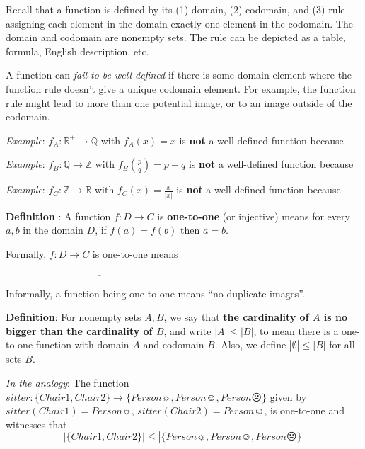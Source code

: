 \documentclass[12pt, oneside]{article}
\begin{document}
\vspace{100pt} \newpage


Recall that a function is defined by its (1) domain, (2) codomain, and (3) rule assigning each 
element in the domain exactly one element in the codomain. 
The domain and codomain are nonempty sets.
The rule can be depicted as a table, formula, English description, etc.

A function can {\it fail to be well-defined} if there is some 
domain element where the function rule doesn't give a
unique codomain element. For example, the function rule might lead to 
more than one potential image, or to an image outside of the codomain.


{\it Example}: $f_A: \mathbb{R}^+ \to \mathbb{Q}$ with $f_A(x) = x$ is {\bf not} a well-defined function because

\vspace{100pt}


{\it Example}: $f_B: \mathbb{Q} \to \mathbb{Z}$ with $f_B\left(\frac{p}{q}\right) = p+q$ is {\bf not} a well-defined function because

\vspace{100pt}


{\it Example}: $f_C: \mathbb{Z} \to \mathbb{R}$ with $f_C(x) = \frac{x}{|x|}$ is {\bf not} a well-defined function because

\vspace{100pt}
 \newpage


{\bf Definition} : A function $f: D  \to C$ is {\bf one-to-one} (or  injective) 
means for every $a,b$ in the domain $D$, 
if $f(a) = f(b)$ then  $a=b$.

Formally, $f: D  \to  C$ is  one-to-one  means $\underline{\phantom{\forall a \in D \forall b \in D ~(f(a) = f(b) \to a = b)}}$.
 

Informally, a function being one-to-one means ``no duplicate images''.

\phantom{Draw finite domain, finite codomain picture with duplicate image.}
\vspace{50pt} 

{\bf Definition}:  For nonempty sets $A, B$, we say that {\bf the  cardinality of $A$ is  no  bigger than the cardinality of $B$}, 
and write $|A| \leq |B|$, to mean there is a  one-to-one function  with domain $A$  and codomain $B$.
Also, we define $|\emptyset| \leq |B|$ for all sets $B$. 

{\it In the analogy}: The function $sitter: \{ Chair1, Chair2\} \to \{ Person\sun, Person\smiley, Person\frownie \}$ given
by $sitter(Chair1) = Person\sun$,  $sitter(Chair2) = Person\smiley$, is one-to-one and witnesses that 
\[
| \{ Chair1, Chair2\} | \leq |\{ Person\sun, Person\smiley, Person\frownie \}|
\] \newpage
\end{document}
